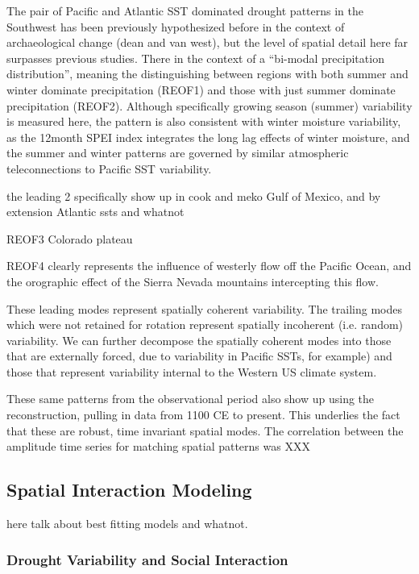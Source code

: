 \documentclass[fleqn,10pt]{wlscirep}
\begin{document}
The pair of Pacific and Atlantic SST dominated drought patterns in the Southwest has been previously hypothesized before in the context of archaeological change (dean and van west), but the level of spatial detail here far surpasses previous studies. There in the context of a ``bi-modal precipitation distribution'', meaning the distinguishing between regions with both summer and winter dominate precipitation (REOF1) and those with just summer dominate precipitation (REOF2). Although specifically growing season (summer) variability is measured here, the pattern is also consistent with winter moisture variability, as the 12month SPEI index integrates the long lag effects of winter moisture, and the summer and winter patterns are governed by similar atmospheric teleconnections to Pacific SST variability.

the leading 2 specifically show up  in cook and meko
Gulf of Mexico, and by extension Atlantic ssts and whatnot

REOF3
Colorado plateau

REOF4 clearly represents the influence of westerly flow off the Pacific Ocean, and the orographic effect of the Sierra Nevada mountains intercepting this flow.

These leading modes represent spatially coherent variability. The trailing modes which were not retained for rotation represent spatially incoherent (i.e. random) variability. We can further decompose the spatially coherent modes into those that are externally forced, due to variability in Pacific SSTs, for example) and those that represent variability internal to the Western US climate system.

These same patterns from the observational period also show up using the reconstruction, pulling in data from 1100 CE to present. This underlies the fact that these are robust, time invariant spatial modes. The correlation between the amplitude time series for matching spatial patterns was XXX


\subsection*{Spatial Interaction Modeling}

here talk about best fitting models and whatnot.




\subsubsection*{Drought Variability and Social Interaction}
\end{document}
